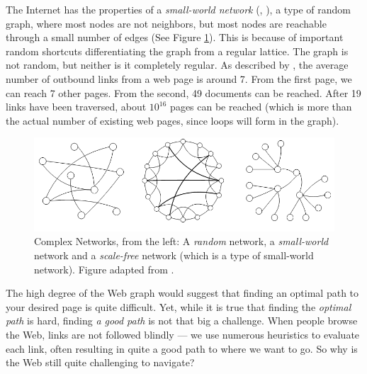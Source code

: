 The Internet has the properties of a \emph{small-world network} (\citep{Newman2000}, \citep[p2]{Huang2005}), 
a type of random graph, where most nodes are not neighbors, but most nodes are reachable through a small number of edges (See Figure \ref{fig:swn}). 
This is because of important random shortcuts differentiating the graph from a regular lattice. 
The graph is not  random, but neither is it completely regular.
As described by \citet[p37]{Barabasi2003}, the average number of outbound links from a web page is around 7.
From the first page, we can reach 7 other pages. From the second, 49 documents can be reached. 
After 19 links have been traversed, about $10^{16}$ pages can be reached (which is more than the actual number of existing web pages, since loops will form in the graph).

\begin{figure}[t]
  \includegraphics[width=\textwidth]{../graphics/graphs}
  \caption[Examples of Complex Networks]{
    Complex Networks,
    from the left: A \emph{random} network, a \emph{small-world} network and a \emph{scale-free} network 
    (which is a type of  small-world network). Figure adapted from \citep[p2]{Huang2005}.} 
  \label{fig:swn}
\end{figure}


The high degree of the Web graph would suggest that finding an optimal path to your desired page is quite difficult. 
Yet, while it is true that finding the \emph{optimal path} is hard, finding \emph{a good path} is not that big a challenge. 
When people browse the Web, links are not followed blindly --- 
we use numerous heuristics to evaluate each link, often resulting in quite a good path to where we want to go. 
So why is the Web still quite challenging to navigate?

